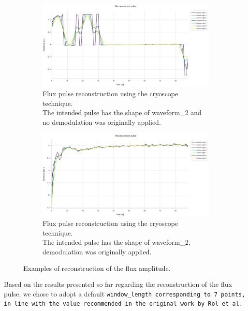 \begin{figure}[h!]
    \begin{subfigure}[t]{0.45\textwidth}
        \includegraphics[width=\textwidth]{figures/png/Cryoscope/no_demod/long/amplitude_windows.png}
        \caption{Flux pulse reconstruction using the cryoscope technique.\\
        The intended pulse has the shape of waveform\_2 and no demodulation was originally applied.}
        \label{fig:amplitude:long_no_dem}
    \end{subfigure}
    \hfill
    \begin{subfigure}[t]{0.45\textwidth}
        \includegraphics[width=\textwidth]{figures/png/Cryoscope/demodulation/long/amplitude_windows.png}
        \caption{Flux pulse reconstruction using the cryoscope technique.\\
        The intended pulse has the shape of waveform\_2, demodulation was originally applied.}
        \label{fig:amplitude:long_dem}
    \end{subfigure}

    \caption{Examples of reconstruction of the flux amplitude.}
    \label{fig:amplitude}
\end{figure}

Based on the results presented so far regarding the reconstruction of the flux pulse, we chose to adopt a default \tt{window\_length} corresponding to 7 points, in line with the value recommended in the original work by Rol et al.

